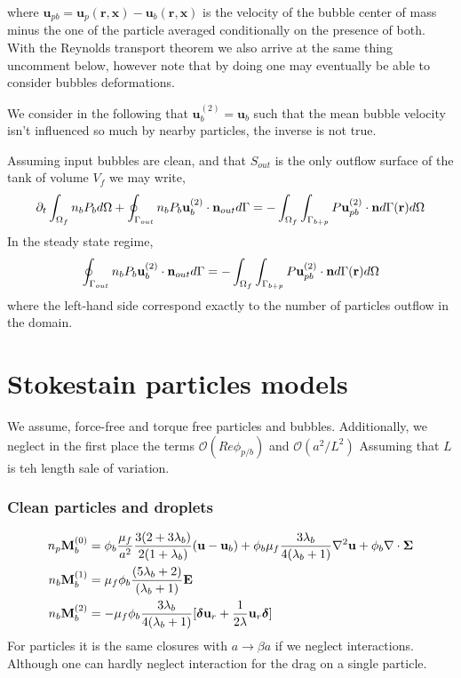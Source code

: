 \documentclass[12pt]{My_preprint}
\begin{document}
where $\textbf{u}_{pb} = \textbf{u}_p(\textbf{r},\textbf{x}) - \textbf{u}_b(\textbf{r},\textbf{x})$ is the velocity of the bubble center of mass minus the one of the particle averaged conditionally on the presence of both. 
With the Reynolds transport theorem we also arrive at the same thing uncomment below, however note that by doing one may eventually be able to consider bubbles deformations. 


We consider in the following that $\textbf{u}_b^{(2)} = \textbf{u}_b$ such that the mean bubble velocity isn't influenced so much by nearby particles, the inverse is not true. 

Assuming input bubbles are clean, and that $S_{out}$ is the only outflow surface of the tank of volume $V_f$ we may write, 
\begin{equation}
    \pddt \intOf{ n_bP_b}
    + \intS[out]{ n_b P_b \textbf{u}_b^{(2)} \cdot \textbf{n}_{out}}
    =  
    - \intOf{\int_{\Gamma_{b+p}} P \textbf{u}_{pb}^{(2)}\cdot \textbf{n} d\Gamma(\textbf{r})}
\end{equation}
In  the steady state regime, 
\begin{equation}
    \intS[out]{ n_b P_b \textbf{u}_b^{(2)} \cdot \textbf{n}_{out}}
    =  
    - \intOf{\int_{\Gamma_{b+p}} P \textbf{u}_{pb}^{(2)}\cdot \textbf{n} d\Gamma(\textbf{r})}
\end{equation}
where the left-hand side correspond exactly to the number of particles outflow in the domain. 


\section{Stokestain particles models }
We assume, force-free and torque free particles and bubbles. 
Additionally, we neglect in the first place the terms $\mathcal{O}(Re \phi_{p/b})$ and $\mathcal{O}(a^2/L^2)$ Assuming that $L$ is teh length sale of variation. 

\subsubsection*{Clean particles and droplets}

\begin{align}
    n_p \textbf{M}_b^{(0)}
    &=
    \phi_b
    \frac{\mu_f}{a^2}
    \frac{3(2+3\lambda_b)}{2(1+\lambda_b)}(\textbf{u} - \textbf{u}_b)
    + \phi_b\mu_f  \frac{3\lambda_b}{4(\lambda_b +1)} \grad^2 \textbf{u}
    + \phi_b \div\bm\Sigma
    \\
    n_b \textbf{M}_b^{(1)}
    &= \mu_f \phi_b 
    \frac{(5\lambda_b +2)}{(\lambda_b +1)}\textbf{E} 
    \\
    n_b \textbf{M}_b^{(2)} 
    &=
    - \mu_f \phi_b \frac{3\lambda_b}{4(\lambda_b +1)}[\bm\delta \textbf{u}_r + \frac{1}{2\lambda}\textbf{u}_r \bm\delta ]
\end{align}
For particles it is the same closures with $a \to \beta a$ if we neglect interactions. 
Although one can hardly neglect interaction for the drag on a single particle. 
\end{document}
